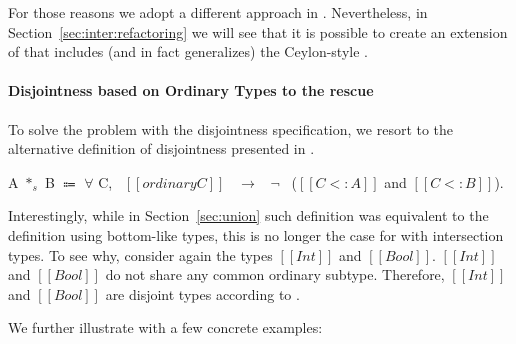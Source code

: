 For those reasons we adopt a different approach in \name.
Nevertheless, in Section~\ref{sec:inter:refactoring} we will see that it is possible to
create an extension of \name that includes (and in fact generalizes)
the Ceylon-style .

\paragraph{Disjointness based on Ordinary Types to the rescue}
To solve the problem with the disjointness specification, we resort to
the alternative definition of disjointness presented in .

\begin{definition}
\label{def:inter:disj}
  A $*_s$ B $\Coloneqq$ $\forall$ C, \ $[[ordinary C]]$ \ $\rightarrow$ \ $\neg$ \ ($[[C <: A]]$ and $[[C <: B]]$).
\end{definition}

Interestingly, while in Section~\ref{sec:union} such definition was
equivalent to the definition using bottom-like types, this is no
longer the case for \name with intersection types. To see why,
consider again the types $[[Int]]$ and $[[Bool]]$.  $[[Int]]$ and
$[[Bool]]$ do not share any common ordinary subtype. Therefore,
$[[Int]]$ and $[[Bool]]$ are disjoint types according to
.
\begin{comment}
We extend our previous example of type $[[Int]]$ and type $[[Bool]]$ and show how
disjointness based upon ordinary types categorize them as disjoint types.
An important observation at this point is common subtypes of type $[[Int]]$ and type $[[Bool]]$
cannot include either $[[Int]]$ or $[[Bool]]$. Problematic types are the intersection types
such as $[[Int /\ Bool]]$. We empahsize the point that ordinary types in \cal does not contain
intersection types. Further, all ordinary types are non-overlapping in \cal.
Therefore, now we say that
two types are disjoint if they do not have any common ordinary subtype. $[[Int]]$ and $[[Bool]]$
do not share any common ordinary subtype. Therefore, $[[Int]]$ and $[[Bool]]$ are disjoint types.
\Cref{def:inter:disj} shows the declarative disjointness for \cal with intersection types:


\noindent Two types $[[A]]$ and $[[B]]$ are
disjoint if the two types $[[A /\ B]]$ do
not have any common ordinary subtype. For example, $[[Int]]$ and $[[A -> B]]$
are disjoint types because there is no ordinary type that is a subtype
of both types ($[[Int]]$ and $[[A -> B]]$).
\Cref{def:inter:disj} is the same as 
\Cref{def:union:disj1}. However, while the \Cref{def:union:disj1} in \Cref{sec:union:discussion}
is equivalent the definition of disjointness using bottom-like types (\Cref{def:union:disj}),
in the calculus with intersection types that is no longer the case.
\end{comment}
We further illustrate  
 with a few concrete examples:

